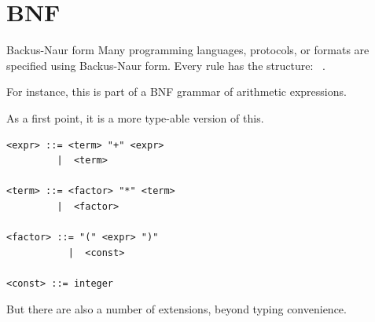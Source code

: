 \documentclass[9pt,t,serif,professionalfont,xcolor={table,dvipsnames},noamsthm]{beamer}
\begin{document}
\section{BNF}
\begin{frame}[fragile]{Backus-Naur form}
Many programming languages, protocols, or formats are specified
using Backus-Naur form.
Every rule has the structure:
\mbox{ \bnfproduces {}}.

For instance, this is part of a BNF grammar of arithmetic expressions.




\begin{grammar}
 \produces {} \trm{+} 
  \syntaxor {}

 \produces {} \trm{*} 
  \syntaxor {}

 \produces \trm{(}  \trm{)} 
  \syntaxor {}

 \produces {} 
\end{grammar}

As a first point, it is a more type-able version of this.
\begin{lstlisting}
<expr> ::= <term> "+" <expr>
         |  <term>

<term> ::= <factor> "*" <term>
         |  <factor>

<factor> ::= "(" <expr> ")"
           |  <const>

<const> ::= integer
\end{lstlisting}
But there are also a number of extensions, beyond typing convenience.
\end{frame}
\end{document}

